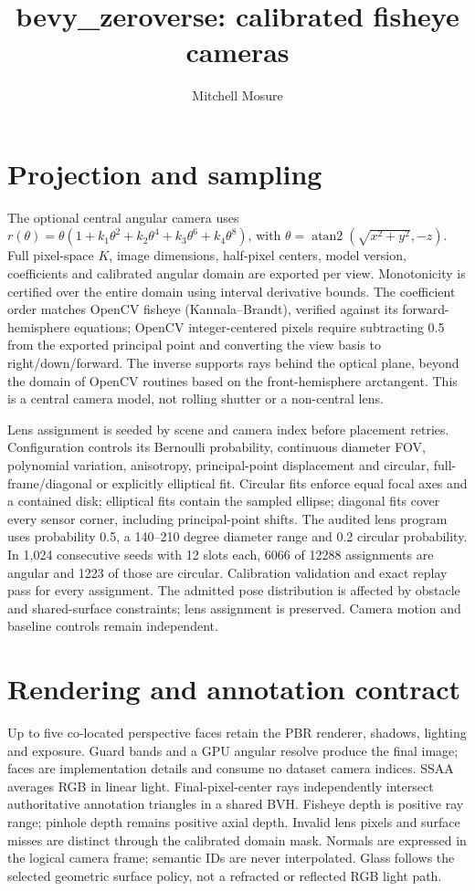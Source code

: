 \documentclass{article}
\title{bevy\_zeroverse: calibrated fisheye cameras}
\author{Mitchell Mosure}
\date{}
\begin{document}
\maketitle
\section{Projection and sampling}
The optional central angular camera uses $r(\theta)=\theta(1+k_1\theta^2+k_2\theta^4+k_3\theta^6+k_4\theta^8)$, with $\theta=\operatorname{atan2}(\sqrt{x^2+y^2},-z)$. Full pixel-space $K$, image dimensions, half-pixel centers, model version, coefficients and calibrated angular domain are exported per view. Monotonicity is certified over the entire domain using interval derivative bounds. The coefficient order matches OpenCV fisheye (Kannala--Brandt), verified against its forward-hemisphere equations; OpenCV integer-centered pixels require subtracting 0.5 from the exported principal point and converting the view basis to right/down/forward. The inverse supports rays behind the optical plane, beyond the domain of OpenCV routines based on the front-hemisphere arctangent. This is a central camera model, not rolling shutter or a non-central lens.

Lens assignment is seeded by scene and camera index before placement retries. Configuration controls its Bernoulli probability, continuous diameter FOV, polynomial variation, anisotropy, principal-point displacement and circular, full-frame/diagonal or explicitly elliptical fit. Circular fits enforce equal focal axes and a contained disk; elliptical fits contain the sampled ellipse; diagonal fits cover every sensor corner, including principal-point shifts. The audited lens program uses probability 0.5, a 140--210 degree diameter range and 0.2 circular probability. In 1,024 consecutive seeds with 12 slots each, 6066 of 12288 assignments are angular and 1223 of those are circular. Calibration validation and exact replay pass for every assignment. The admitted pose distribution is affected by obstacle and shared-surface constraints; lens assignment is preserved. Camera motion and baseline controls remain independent.

\section{Rendering and annotation contract}
Up to five co-located perspective faces retain the PBR renderer, shadows, lighting and exposure. Guard bands and a GPU angular resolve produce the final image; faces are implementation details and consume no dataset camera indices. SSAA averages RGB in linear light. Final-pixel-center rays independently intersect authoritative annotation triangles in a shared BVH. Fisheye depth is positive ray range; pinhole depth remains positive axial depth. Invalid lens pixels and surface misses are distinct through the calibrated domain mask. Normals are expressed in the logical camera frame; semantic IDs are never interpolated. Glass follows the selected geometric surface policy, not a refracted or reflected RGB light path.
\end{document}
